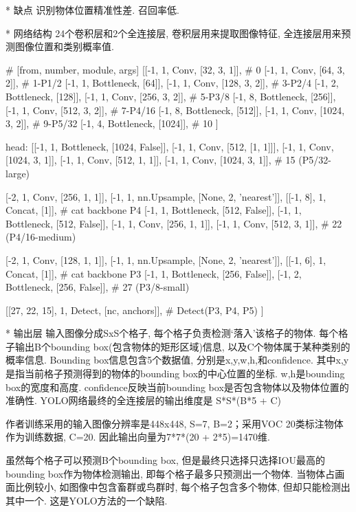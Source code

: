 {				* 缺点
					识别物体位置精准性差. 召回率低. 

			* 网络结构
				24个卷积层和2个全连接层, 卷积层用来提取图像特征, 全连接层用来预测图像位置和类别概率值. 

				# [from, number, module, args]
				[[-1, 1, Conv, [32, 3, 1]],  # 0
				 [-1, 1, Conv, [64, 3, 2]],  # 1-P1/2
				 [-1, 1, Bottleneck, [64]],
				 [-1, 1, Conv, [128, 3, 2]],  # 3-P2/4
				 [-1, 2, Bottleneck, [128]],
				 [-1, 1, Conv, [256, 3, 2]],  # 5-P3/8
				 [-1, 8, Bottleneck, [256]],
				 [-1, 1, Conv, [512, 3, 2]],  # 7-P4/16
				 [-1, 8, Bottleneck, [512]],
				 [-1, 1, Conv, [1024, 3, 2]],  # 9-P5/32
				 [-1, 4, Bottleneck, [1024]],  # 10
				]

				head:
				[[-1, 1, Bottleneck, [1024, False]],
				 [-1, 1, Conv, [512, [1, 1]]],
				 [-1, 1, Conv, [1024, 3, 1]],
				 [-1, 1, Conv, [512, 1, 1]],
				 [-1, 1, Conv, [1024, 3, 1]],  # 15 (P5/32-large)
			  
				 [-2, 1, Conv, [256, 1, 1]],
				 [-1, 1, nn.Upsample, [None, 2, 'nearest']],
				 [[-1, 8], 1, Concat, [1]],  # cat backbone P4
				 [-1, 1, Bottleneck, [512, False]],
				 [-1, 1, Bottleneck, [512, False]],
				 [-1, 1, Conv, [256, 1, 1]],
				 [-1, 1, Conv, [512, 3, 1]],  # 22 (P4/16-medium)
			  
				 [-2, 1, Conv, [128, 1, 1]],
				 [-1, 1, nn.Upsample, [None, 2, 'nearest']],
				 [[-1, 6], 1, Concat, [1]],  # cat backbone P3
				 [-1, 1, Bottleneck, [256, False]],
				 [-1, 2, Bottleneck, [256, False]],  # 27 (P3/8-small)
			  
				 [[27, 22, 15], 1, Detect, [nc, anchors]],   # Detect(P3, P4, P5)
				]
			  

				* 输出层
					输入图像分成SxS个格子, 每个格子负责检测‘落入’该格子的物体. 每个格子输出B个bounding box(包含物体的矩形区域)信息, 以及C个物体属于某种类别的概率信息. Bounding box信息包含5个数据值, 分别是x,y,w,h,和confidence. 其中x,y是指当前格子预测得到的物体的bounding box的中心位置的坐标. w,h是bounding box的宽度和高度. confidence反映当前bounding box是否包含物体以及物体位置的准确性. YOLO网络最终的全连接层的输出维度是 S*S*(B*5 + C)

					作者训练采用的输入图像分辨率是448x448, S=7, B=2；采用VOC 20类标注物体作为训练数据, C=20. 因此输出向量为7*7*(20 + 2*5)=1470维. 

					虽然每个格子可以预测B个bounding box, 但是最终只选择只选择IOU最高的bounding box作为物体检测输出, 即每个格子最多只预测出一个物体. 当物体占画面比例较小, 如图像中包含畜群或鸟群时, 每个格子包含多个物体, 但却只能检测出其中一个. 这是YOLO方法的一个缺陷. 

}
